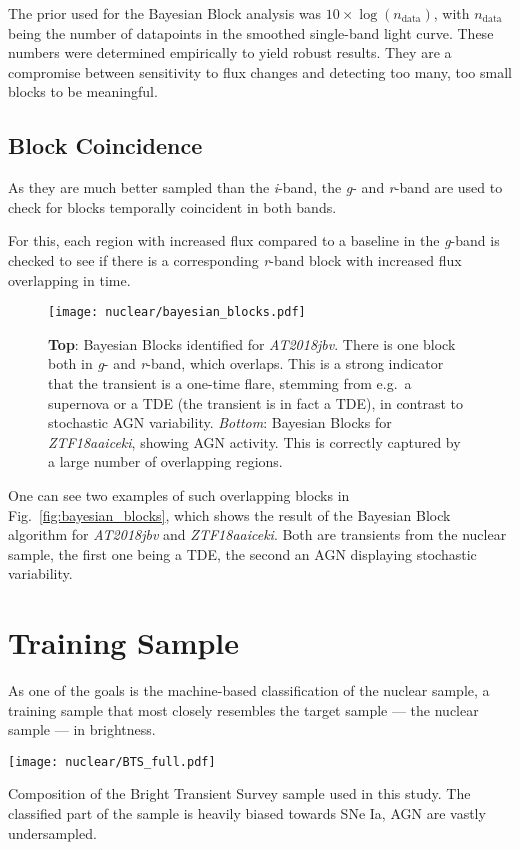 The prior used for the Bayesian Block analysis was $10 \times \log(n_\text{data})$, with $n_\text{data}$ being the number of datapoints in the smoothed single-band light curve. These numbers were determined empirically to yield robust results. They are a compromise between sensitivity to flux changes and detecting too many, too small blocks to be meaningful.

\subsection{Block Coincidence}
As they are much better sampled than the \textit{i}-band, the \textit{g}- and \textit{r}-band are used to check for blocks temporally coincident in both bands.

For this, each region with increased flux compared to a baseline in the \textit{g}-band is checked to see if there is a corresponding \textit{r}-band block with increased flux overlapping in time.

\begin{figure}
  \texttt{[image: nuclear/bayesian\_blocks.pdf]}
  \caption[Bayesian blocks]{\textbf{Top}: Bayesian Blocks identified for \textit{AT2018jbv}. There is one block both in \textit{g}- and \textit{r}-band, which overlaps. This is a strong indicator that the transient is a one-time flare, stemming from e.g.~a supernova or a TDE (the transient is in fact a TDE), in contrast to stochastic AGN variability. \textit{Bottom}: Bayesian Blocks for \textit{ZTF18aaiceki}, showing AGN activity. This is correctly captured by a large number of overlapping regions.}
\end{figure}

One can see two examples of such overlapping blocks in Fig.~\ref{fig:bayesian_blocks}, which shows the result of the Bayesian Block algorithm for \textit{AT2018jbv} and \textit{ZTF18aaiceki}. Both are transients from the nuclear sample, the first one being a TDE, the second an AGN displaying stochastic variability.

\section{Training Sample}
As one of the goals is the machine-based classification of the nuclear sample, a training sample that most closely resembles the target sample --- the nuclear sample --- in brightness.

\begin{marginfigure}
  \texttt{[image: nuclear/BTS\_full.pdf]}
  \caption[BTS Composition]{Composition of the Bright Transient Survey sample used in this study. The classified part of the sample is heavily biased towards SNe Ia, AGN are vastly undersampled.}
\end{marginfigure}


